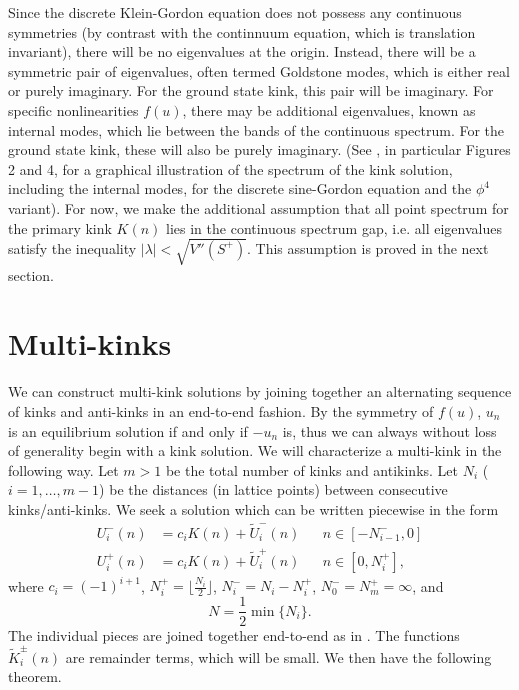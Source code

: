 \documentclass[12pt,reqno]{amsart}
\begin{document}
Since the discrete Klein-Gordon equation does not possess any continuous symmetries (by contrast with the continnuum equation, which is translation invariant), there will be no eigenvalues at the origin. Instead, there will be a symmetric pair of eigenvalues, often termed Goldstone modes, which is either real or purely imaginary. For the ground state kink, this pair will be imaginary. For specific nonlinearities $f(u)$, there may be additional eigenvalues, known as internal modes, which lie between the bands of the continuous spectrum. For the ground state kink, these will also be purely imaginary. (See \cite{KevrekidisWeinstein2000}, in particular Figures 2 and 4, for a graphical illustration of the spectrum of the kink solution, including the internal modes, for the discrete sine-Gordon equation and the $\phi^4$ variant). For now, we make the additional assumption that all point spectrum for the primary kink $K(n)$ lies in the continuous spectrum gap, i.e. all eigenvalues satisfy the inequality $|\lambda| < \sqrt{V''(S^+)}$. This assumption is proved in the next section.

\section{Multi-kinks}

We can construct multi-kink solutions by joining together an alternating sequence of kinks and anti-kinks in an end-to-end fashion. By the symmetry of $f(u)$, $u_n$ is an equilibrium solution if and only if $-u_n$ is, thus we can always without loss of generality begin with a kink solution. We will characterize a multi-kink in the following way. Let $m > 1$ be the total number of kinks and antikinks. Let $N_i$ ($i = 1, \dots, m-1$) be the distances (in lattice points) between consecutive kinks/anti-kinks. We seek a solution which can be written piecewise in the form 
\begin{equation}\label{eq:Upiecewise}
\begin{aligned}
U_i^-(n) &= c_i K(n) + \tilde{U}_i^-(n) && n \in [-N_{i-1}^-, 0] \\
U_i^+(n) &= c_i K(n) + \tilde{U}_i^+(n) && n \in [0, N_i^+],
\end{aligned}
\end{equation}
where $c_i = (-1)^{i+1}$, $N_i^+ = \lfloor \frac{N_i}{2} \rfloor$, $N_i^- = N_i - N_i^+$, $N_0^- = N_m^+ = \infty$, and
\begin{equation}\label{defN}
N = \frac{1}{2} \min\{ N_i \}.
\end{equation}
The individual pieces are joined together end-to-end as in \cites{Sandstede1998,Parker2020}. The functions $\tilde{K}_i^\pm(n)$ are remainder terms, which will be small. We then have the following theorem.
\end{document}
